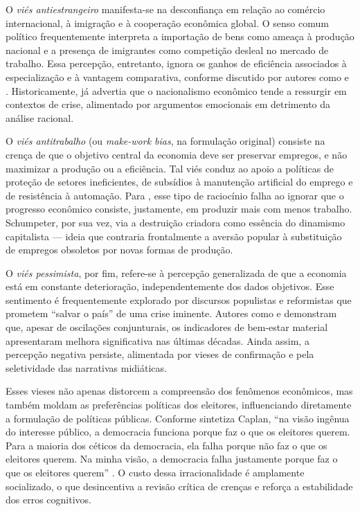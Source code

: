 O \textit{viés antiestrangeiro} manifesta-se na desconfiança em relação ao comércio internacional, à imigração e à cooperação econômica global. O senso comum político frequentemente interpreta a importação de bens como ameaça à produção nacional e a presença de imigrantes como competição desleal no mercado de trabalho. Essa percepção, entretanto, ignora os ganhos de eficiência associados à especialização e à vantagem comparativa, conforme discutido por autores como  e . Historicamente,  já advertia que o nacionalismo econômico tende a ressurgir em contextos de crise, alimentado por argumentos emocionais em detrimento da análise racional.

O \textit{viés antitrabalho} (ou \textit{make-work bias}, na formulação original) consiste na crença de que o objetivo central da economia deve ser preservar empregos, e não maximizar a produção ou a eficiência. Tal viés conduz ao apoio a políticas de proteção de setores ineficientes, de subsídios à manutenção artificial do emprego e de resistência à automação. Para , esse tipo de raciocínio falha ao ignorar que o progresso econômico consiste, justamente, em produzir mais com menos trabalho. Schumpeter, por sua vez, via a destruição criadora como essência do dinamismo capitalista — ideia que contraria frontalmente a aversão popular à substituição de empregos obsoletos por novas formas de produção.

O \textit{viés pessimista}, por fim, refere-se à percepção generalizada de que a economia está em constante deterioração, independentemente dos dados objetivos. Esse sentimento é frequentemente explorado por discursos populistas e reformistas que prometem ``salvar o país'' de uma crise iminente. Autores como  e  demonstram que, apesar de oscilações conjunturais, os indicadores de bem-estar material apresentaram melhora significativa nas últimas décadas. Ainda assim, a percepção negativa persiste, alimentada por vieses de confirmação e pela seletividade das narrativas midiáticas.

Esses vieses não apenas distorcem a compreensão dos fenômenos econômicos, mas também moldam as preferências políticas dos eleitores, influenciando diretamente a formulação de políticas públicas. Conforme sintetiza Caplan, ``na visão ingênua do interesse público, a democracia funciona porque faz o que os eleitores querem. Para a maioria dos céticos da democracia, ela falha porque não faz o que os eleitores querem. Na minha visão, a democracia falha justamente porque faz o que os eleitores querem'' \cite[p.~3]{The_Myth_of_the_Rational_Voter}. O custo dessa irracionalidade é amplamente socializado, o que desincentiva a revisão crítica de crenças e reforça a estabilidade dos erros cognitivos.


